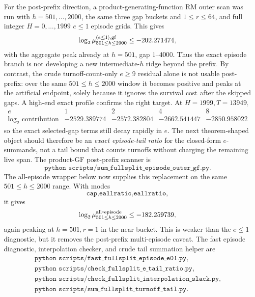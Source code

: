 For the post-prefix direction, a product-generating-function RM outer scan was run with \(h=501,\ldots,2000\), the
same three gap buckets and \(1\le r\le64\), and full integer \(H=0,\ldots,1999\) \(e\le1\) episode grids.  This gives
\[
\log_2 \mu_{501\le h\le2000}^{(e\le1),{\rm gf}}
\le -202.271474,
\]
with the aggregate peak already at \(h=501\), gap \(1\text{--}4000\).  Thus the exact episode branch is not developing
a new intermediate-\(h\) ridge beyond the prefix.  By contrast, the crude turnoff-count-only \(e\ge9\) residual alone is
not usable post-prefix: over the same \(501\le h\le2000\) window it becomes positive and peaks at the artificial
endpoint, solely because it ignores the survival cost after the skipped gaps.  A high-end exact profile confirms the
right target.  At \(H=1999,T=13949\),
\[
\begin{array}{c|cccc}
e & 1 & 2 & 4 & 8\\
\hline
\log_2\text{ contribution} & -2529.389774 & -2572.382804 & -2662.541447 & -2850.958022
\end{array}
\]
so the exact selected-gap terms still decay rapidly in \(e\).  The next theorem-shaped object should therefore be an
\emph{exact episode-tail ratio} for the closed-form \(e\)-summands, not a tail bound that counts turnoffs without
charging the remaining live span.  The product-GF post-prefix scanner is
\[
\texttt{python scripts/sum\_fullsplit\_episode\_outer\_gf.py}.
\]
The all-episode wrapper below now supplies this replacement on the same \(501\le h\le2000\) range.  With modes
\[
\texttt{cap,eallratio,eallratio},
\]
it gives
\[
\log_2 \mu_{501\le h\le2000}^{\rm all\mbox{-}episode}
\le -182.259739,
\]
again peaking at \(h=501,r=1\) in the near bucket.  This is weaker than the \(e\le1\) diagnostic, but it removes the
post-prefix multi-episode caveat.
The fast episode diagnostic, interpolation checker, and crude tail summation helper are
\[
\begin{gathered}
\texttt{python scripts/fast\_fullsplit\_episode\_e01.py},\\
\texttt{python scripts/check\_fullsplit\_e\_tail\_ratio.py},\\
\texttt{python scripts/check\_fullsplit\_interpolation\_slack.py},\\
\texttt{python scripts/sum\_fullsplit\_turnoff\_tail.py}.
\end{gathered}
\]

